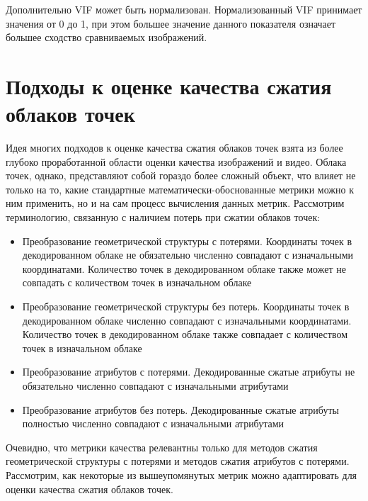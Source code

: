 Дополнительно VIF может быть нормализован. Нормализованный VIF принимает
значения от 0 до 1, при этом большее значение данного показателя означает
большее сходство сравниваемых изображений.



\section{Подходы к оценке качества сжатия облаков точек}




Идея многих подходов к оценке качества сжатия облаков точек взята из более
глубоко проработанной области оценки качества изображений и видео. Облака точек,
однако, представляют собой гораздо более сложный объект, что влияет не только на
то, какие стандартные математически-обоснованные метрики можно к ним применить,
но и на сам процесс вычисления данных метрик. Рассмотрим терминологию, связанную
с наличием потерь при сжатии облаков точек\cite{CallForProposalV2}:

\begin{itemize}
    \item Преобразование геометрической структуры с потерями. Координаты точек в
    декодированном облаке не обязательно численно совпадают с изначальными
    координатами. Количество точек в декодированном облаке также может не
    совпадать с количеством точек в изначальном облаке
    \item Преобразование геометрической структуры без потерь. Координаты точек в
    декодированном облаке численно совпадают с изначальными координатами.
    Количество точек в декодированном облаке также совпадает с количеством точек
    в изначальном облаке
    \item Преобразование атрибутов с потерями. Декодированные сжатые атрибуты не
    обязательно численно совпадают с изначальными атрибутами
    \item Преобразование атрибутов без потерь. Декодированные сжатые атрибуты
    полностью численно совпадают с изначальными атрибутами
\end{itemize}

Очевидно, что метрики качества релевантны только для методов сжатия
геометрической структуры с потерями и методов сжатия атрибутов с потерями.
Рассмотрим, как некоторые из вышеупомянутых метрик можно адаптировать для оценки
качества сжатия облаков точек.

